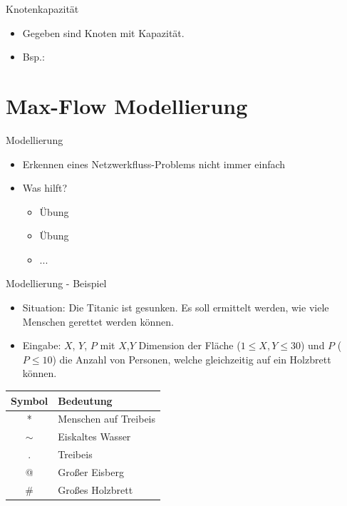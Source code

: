 \documentclass[18pt]{beamer}
\begin{document}
\begin{frame}{Knotenkapazit\"at}
\begin{itemize}
\item Gegeben sind Knoten mit Kapazit\"at.
\item Bsp.:
\end{itemize}
\begin{center}
\end{center}
\end{frame}

\section{Max-Flow Modellierung}
\begin{frame}{Modellierung}
\begin{itemize}
\item Erkennen eines Netzwerkfluss-Problems nicht immer einfach
\pause
\item Was hilft?
\begin{itemize}
\pause
\item \"Ubung
\item \"Ubung
\item ...
\end{itemize}
\end{itemize}
\end{frame}

\begin{frame}{Modellierung - Beispiel}
\begin{itemize}
\item Situation: Die Titanic ist gesunken. Es soll ermittelt werden, wie viele Menschen gerettet werden k\"onnen.
\item Eingabe: $X$, $Y$, $P$ mit $X$,$Y$ Dimension der Fl\"ache (\(1 \leq X,Y \leq 30\)) und $P$ (\(P \leq 10\)) die Anzahl von Personen, welche gleichzeitig auf ein Holzbrett k\"onnen.
\end{itemize}
\begin{center}
\begin{tabular}{c|l}
Symbol & Bedeutung \\
\hline
* & Menschen auf Treibeis \\
\(\sim\) & Eiskaltes Wasser \\
. & Treibeis \\
@ & Gro\ss er Eisberg \\
\# & Gro\ss es Holzbrett \\
\end{tabular}
\end{center}
\end{frame}
\end{document}
